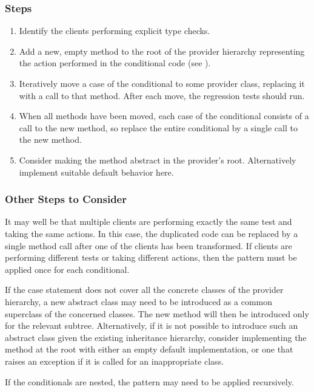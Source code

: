 \documentclass[a4paper,10pt,twoside]{book}
\begin{document}
\subsubsection*{Steps}

\begin{enumerate}
  \item Identify the clients performing explicit type checks.

  \item Add a new, empty method to the root of the provider hierarchy representing the action performed in the conditional code (see ).

  \item Iteratively move a case of the conditional to some provider class, replacing it with a call to that method. After each move, the regression tests should run.

  \item When all methods have been moved, each case of the conditional consists of a call to the new method, so replace the entire conditional by a single call to the new method.

  \item Consider making the method abstract in the provider's root. Alternatively implement suitable default behavior here.
\end{enumerate}

\subsubsection*{Other Steps to Consider}

\begin{bulletlist}
\item It may well be that multiple clients are performing exactly the same test and taking the same actions. In this case, the duplicated code can be replaced by a single method call after one of the clients has been transformed. If clients are performing different tests or taking different actions, then the pattern must be applied once for each conditional.

\item If the case statement does not cover all the concrete classes of the provider hierarchy, a new abstract class may need to be introduced as a common superclass of the concerned classes. The new method will then be introduced only for the relevant subtree. Alternatively, if it is not possible to introduce such an abstract class given the existing inheritance hierarchy, consider implementing the method at the root with either an empty default implementation, or one that raises an exception if it is called for an inappropriate class.

\item If the conditionals are nested, the pattern may need to be applied recursively.
\end{bulletlist}
\end{document}
